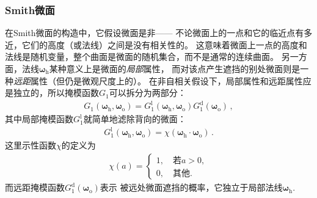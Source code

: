 \subsubsection*{Smith微面}
在Smith微面的构造中，它假设微面是非——
不论微面上的一点和它的临近点有多近，它们的高度（或法线）之间是没有相关性的。
这意味着微面上一点的高度和法线是随机变量，整个曲面是微面的随机集合，而不是通常的连续曲面。
另一方面，法线${\bm\omega}_{\mathrm{h}}$某种意义上是微面的\emph{局部}属性，
而对该点产生遮挡的别处微面则是一种\emph{远距}属性（但仍是微观尺度上的）。
在非自相关假设下，局部属性和远距属性应是独立的，所以掩模函数$G_1$可以拆分为两部分：
\begin{align}\label{eq:08ex01-SeparableMaskingFunction}
    G_1({\bm\omega}_{\mathrm{h}},{\bm\omega}_{\mathrm{o}})
    =G_1^{\mathrm{l}}({\bm\omega}_{\mathrm{h}},{\bm\omega}_{\mathrm{o}})
    G_1^{\mathrm{d}}({\bm\omega}_{\mathrm{o}})\, ,
\end{align}
其中局部掩模函数$G_1^{\mathrm{l}}$就简单地滤除背向的微面：
\begin{align}\label{eq:08ex01-LocalMaskFunction}
    G_1^{\mathrm{l}}({\bm\omega}_{\mathrm{h}},{\bm\omega}_{\mathrm{o}})
    =\chi({\bm\omega}_{\mathrm{h}}\cdot{\bm\omega}_{\mathrm{o}})\, .
\end{align}
这里示性函数$\chi$的定义为
\begin{align}
    \chi(a)=\left\{\begin{array}{l}
        1,\quad\text{若}a>0, \\
        0,\quad\text{其他}.
    \end{array}\right.
\end{align}
而远距掩模函数$G_1^{\mathrm{d}}({\bm\omega}_{\mathrm{o}})$表示
被远处微面遮挡的概率，它独立于局部法线${\bm\omega}_{\mathrm{h}}$.

